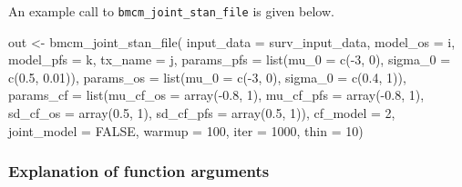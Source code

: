 \documentclass[
]{article}
\newenvironment{Shaded}{\begin{snugshade}}{\end{snugshade}}
\newcommand{\AttributeTok}[1]{\textcolor[rgb]{0.77,0.63,0.00}{#1}}
\newcommand{\ConstantTok}[1]{\textcolor[rgb]{0.00,0.00,0.00}{#1}}
\newcommand{\DecValTok}[1]{\textcolor[rgb]{0.00,0.00,0.81}{#1}}
\newcommand{\FloatTok}[1]{\textcolor[rgb]{0.00,0.00,0.81}{#1}}
\newcommand{\FunctionTok}[1]{\textcolor[rgb]{0.00,0.00,0.00}{#1}}
\newcommand{\NormalTok}[1]{#1}
\newcommand{\OtherTok}[1]{\textcolor[rgb]{0.56,0.35,0.01}{#1}}
\newcommand{\SpecialCharTok}[1]{\textcolor[rgb]{0.00,0.00,0.00}{#1}}
\begin{document}
An example call to \texttt{bmcm\_joint\_stan\_file} is given below.

\begin{Shaded}
\begin{Highlighting}[]
\NormalTok{out }\OtherTok{\textless{}{-}}
  \FunctionTok{bmcm\_joint\_stan\_file}\NormalTok{(}
    \AttributeTok{input\_data =}\NormalTok{ surv\_input\_data,}
    \AttributeTok{model\_os =}\NormalTok{ i,}
    \AttributeTok{model\_pfs =}\NormalTok{ k,}
    \AttributeTok{tx\_name =}\NormalTok{ j,}
    \AttributeTok{params\_pfs =} \FunctionTok{list}\NormalTok{(}\AttributeTok{mu\_0 =} \FunctionTok{c}\NormalTok{(}\SpecialCharTok{{-}}\DecValTok{3}\NormalTok{, }\DecValTok{0}\NormalTok{),}
                      \AttributeTok{sigma\_0 =} \FunctionTok{c}\NormalTok{(}\FloatTok{0.5}\NormalTok{, }\FloatTok{0.01}\NormalTok{)),}
    \AttributeTok{params\_os =} \FunctionTok{list}\NormalTok{(}\AttributeTok{mu\_0 =} \FunctionTok{c}\NormalTok{(}\SpecialCharTok{{-}}\DecValTok{3}\NormalTok{, }\DecValTok{0}\NormalTok{),}
                     \AttributeTok{sigma\_0 =} \FunctionTok{c}\NormalTok{(}\FloatTok{0.4}\NormalTok{, }\DecValTok{1}\NormalTok{)),}
    \AttributeTok{params\_cf =} \FunctionTok{list}\NormalTok{(}\AttributeTok{mu\_cf\_os =} \FunctionTok{array}\NormalTok{(}\SpecialCharTok{{-}}\FloatTok{0.8}\NormalTok{, }\DecValTok{1}\NormalTok{),}
                     \AttributeTok{mu\_cf\_pfs =} \FunctionTok{array}\NormalTok{(}\SpecialCharTok{{-}}\FloatTok{0.8}\NormalTok{, }\DecValTok{1}\NormalTok{),}
                     \AttributeTok{sd\_cf\_os =} \FunctionTok{array}\NormalTok{(}\FloatTok{0.5}\NormalTok{, }\DecValTok{1}\NormalTok{),}
                     \AttributeTok{sd\_cf\_pfs =} \FunctionTok{array}\NormalTok{(}\FloatTok{0.5}\NormalTok{, }\DecValTok{1}\NormalTok{)),}
    \AttributeTok{cf\_model =} \DecValTok{2}\NormalTok{,}
    \AttributeTok{joint\_model =} \ConstantTok{FALSE}\NormalTok{,}
    \AttributeTok{warmup =} \DecValTok{100}\NormalTok{,}
    \AttributeTok{iter =} \DecValTok{1000}\NormalTok{,}
    \AttributeTok{thin =} \DecValTok{10}\NormalTok{)}
\end{Highlighting}
\end{Shaded}

\hypertarget{explanation-of-function-arguments}{%
\subsubsection{Explanation of function
arguments}\label{explanation-of-function-arguments}}
\end{document}
